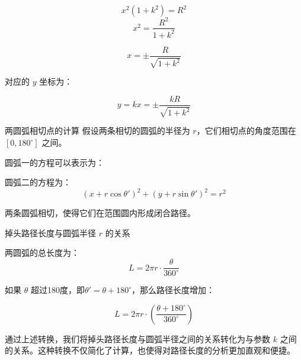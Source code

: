 \documentclass[withoutpreface, bwprint]{cumcmthesis} %
\begin{document}
\begin{equation}
    x^2(
    1 + k^2) = R^2
\end{equation}
\begin{equation}
    x^2 = \frac{R^2}{1 + k^2}
\end{equation}

\begin{equation}
    x = \pm \frac{R}{\sqrt{1 + k^2}}
\end{equation}

对应的 $ y $ 坐标为：

\begin{equation}
    y = kx = \pm \frac{kR}{\sqrt{1 + k^2}}
\end{equation}

两圆弧相切点的计算
假设两条相切的圆弧的半径为 $ r $，它们相切点的角度范围在 $[0, 180^\circ]$ 之间。

圆弧一的方程可以表示为：
\begin{equation}
\end{equation}

圆弧二的方程为：
\begin{equation}
    (x + r \cos \theta')^2 + (y + r \sin \theta')^2 = r^2
\end{equation}

两条圆弧相切，使得它们在范围圆内形成闭合路径。

掉头路径长度与圆弧半径 $ r $ 的关系

两圆弧的总长度为：
\begin{equation}
    L = 2\pi r \cdot \frac{\theta}{360^\circ}
\end{equation}

如果 $\theta$ 超过180度，即$\theta' = \theta + 180^\circ$，那么路径长度增加：

\begin{equation}
    L = 2\pi r \cdot \left(\frac{\theta + 180^\circ}{360^\circ}\right)
\end{equation}

通过上述转换，我们将掉头路径长度与圆弧半径之间的关系转化为与参数 $ k $ 之间的关系。这种转换不仅简化了计算，也使得对路径长度的分析更加直观和便捷。
\end{document}

